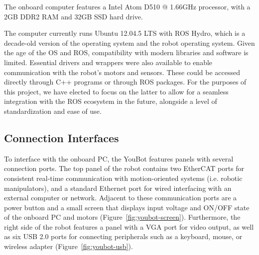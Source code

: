 \documentclass[a4paper, 12pt]{article}
\begin{document}
    The onboard computer features a Intel Atom D510 @ 1.66GHz processor, with a 2GB DDR2 RAM and 32GB SSD hard drive. 

    The computer currently runs Ubuntu 12.04.5 LTS with ROS Hydro, which is a decade-old version of the operating system and the robot operating system. Given the age of the OS and ROS, compatibility with modern libraries and software is limited. Essential drivers and wrappers were also available to enable communication with the robot's motors and sensors. These could be accessed directly through C++ programs or through ROS packages. For the purposes of this project, we have elected to focus on the latter to allow for a seamless integration with the ROS ecosystem in the future, alongside a level of standardization and ease of use.

    \subsection{Connection Interfaces}

    To interface with the onboard PC, the YouBot features panels with several connection ports. The top panel of the robot contains two EtherCAT ports for consistent real-time communication with motion-oriented systems (i.e. robotic manipulators), and a standard Ethernet port for wired interfacing with an external computer or network. Adjacent to these communication ports are a power button and a small screen that displays input voltage and ON/OFF state of the onboard PC and motors (Figure~\ref{fig:youbot-screen}). Furthermore, the right side of the robot features a panel with a VGA port for video output, as well as six USB 2.0 ports for connecting peripherals such as a keyboard, mouse, or wireless adapter (Figure~\ref{fig:youbot-usb}). 
\end{document}
